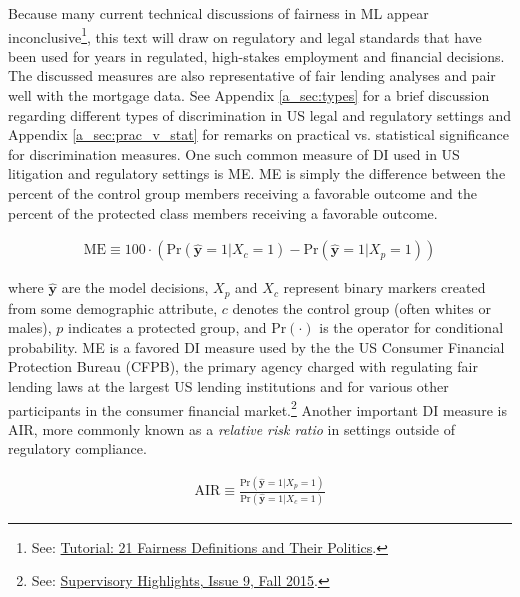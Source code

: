 \documentclass[information,article,submit,moreauthors,pdftex]{definitions/mdpi}
\begin{document}
Because many current technical discussions of fairness in ML appear inconclusive\footnote{See: \href{https://www.youtube.com/watch?v=jIXIuYdnyyk}{Tutorial: 21 Fairness Definitions and Their Politics}.}, this text will draw on regulatory and legal standards that have been used for years in regulated, high-stakes employment and financial decisions. The discussed measures are also representative of fair lending analyses and pair well with the mortgage data. See Appendix \ref{a_sec:types} for a brief discussion regarding different types of discrimination in US legal and regulatory settings and Appendix \ref{a_sec:prac_v_stat} for remarks on practical vs. statistical significance for discrimination measures. One such common measure of DI used in US litigation and regulatory settings is ME. ME is simply the difference between the percent of the control group members receiving a favorable outcome and the percent of the protected class members receiving a favorable outcome. 

\begin{equation}
\label{eq:me}
\begin{aligned}
\text{ME} \equiv 100 \cdot (\text{Pr}(\hat{\mathbf{y}} = 1| X_c = 1)  - \text{Pr}(\hat{\mathbf{y}} = 1 | X_p = 1))
\end{aligned}
\end{equation}

\noindent where $\hat{\mathbf{y}}$ are the model decisions, $X_p$ and $X_c$ represent binary markers created from some demographic attribute, $c$ denotes the control group (often whites or males), $p$ indicates a protected group, and $\text{Pr}(\cdot)$ is the operator for conditional probability.  ME is a favored DI measure used by the the US Consumer Financial Protection Bureau (CFPB), the primary agency charged with regulating fair lending laws at the largest US lending institutions and for various other participants in the consumer financial market.\footnote{See: \href{https://files.consumerfinance.gov/f/201510_cfpb_supervisory-highlights.pdf}{Supervisory Highlights, Issue 9, Fall 2015}.} Another important DI measure is AIR, more commonly known as a \textit{relative risk ratio} in settings outside of regulatory compliance.

\begin{equation}
\label{eq:air}
\begin{aligned}
\text{AIR} \equiv \frac{\text{Pr}(\hat{\mathbf{y}} = 1 | X_p = 1)}{\text{Pr}(\hat{\mathbf{y}} = 1| X_c = 1)}
\end{aligned}
\end{equation}
\end{document}

